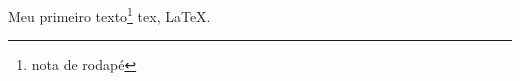 \documentclass{report}
\begin{document}
Meu primeiro texto\footnote{nota de rodapé} tex, \LaTeX.
\end{document}
